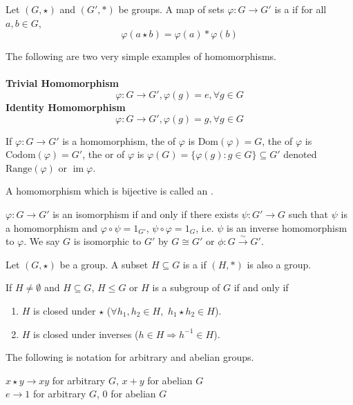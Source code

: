\documentclass{mathnotes}
\DeclareMathOperator{\im}{im}
\begin{document}
\begin{bdefi}
  Let $(G,\star)$ and $(G',\ast)$ be groups. A map of sets $\varphi:G\to G'$ is
  a  if for all $a,b\in G$,
  $$\varphi(a\star b)=\varphi(a)\ast\varphi(b)$$
\end{bdefi}

\begin{ex}
  The following are two very simple examples of homomorphisms.\\\\
  \textbf{Trivial Homomorphism}
  $$\varphi:G\to G',\varphi(g)=e,\forall g\in G$$
  \textbf{Identity Homomorphism}
  $$\varphi:G\to G',\varphi(g)=g,\forall g\in G$$
\end{ex}

\begin{defi}
  If $\varphi:G\to G'$ is a homomorphism, the  of $\varphi$ is
  $\text{Dom}(\varphi)=G$, the  of $\varphi$ is
  $\text{Codom}(\varphi)=G'$, the  or  of
  $\varphi$ is $\varphi(G)=\{\varphi(g):g\in G\}\subseteq G'$ denoted
  $\text{Range}(\varphi)$ or $\im\varphi$.
\end{defi}

\begin{bdefi}
  A homomorphism which is bijective is called an .
\end{bdefi}

$\varphi:G\to G'$ is an isomorphism if and only if there exists $\psi:G'\to G$
such that $\psi$ is a homomorphism and $\varphi\circ\psi=1_{G'}$,
$\psi\circ\varphi=1_{G}$, i.e. $\psi$ is an inverse homomorphism to $\varphi$.
We say $G$ is isomorphic to $G'$ by $G\cong G'$ or
$\phi:G\xrightarrow{\sim}G'$.

\begin{bdefi}
  Let $(G,\star)$ be a group. A subset $H\subseteq G$ is a 
  if $(H,\ast)$ is also a group.
\end{bdefi}

If $H\ne\emptyset$ and $H\subseteq G$, $H\le G$ or $H$ is a subgroup of $G$ if
and only if
\begin{enumerate}
  \item $H$ is closed under $\star$ ($\forall h_1,h_2\in H$,\ $h_1\star h_2\in
    H$).
  \item $H$ is closed under inverses ($h\in H\Rightarrow h^{-1}\in H$).
\end{enumerate}

\begin{note}
  The following is notation for arbitrary and abelian groups.
  \begin{center}
    $x\star y\rightarrow xy$ for arbitrary $G$, $x+y$ for abelian $G$\\
    $e\rightarrow1$ for arbitrary $G$, 0 for abelian $G$
  \end{center}
\end{note}
\end{document}
